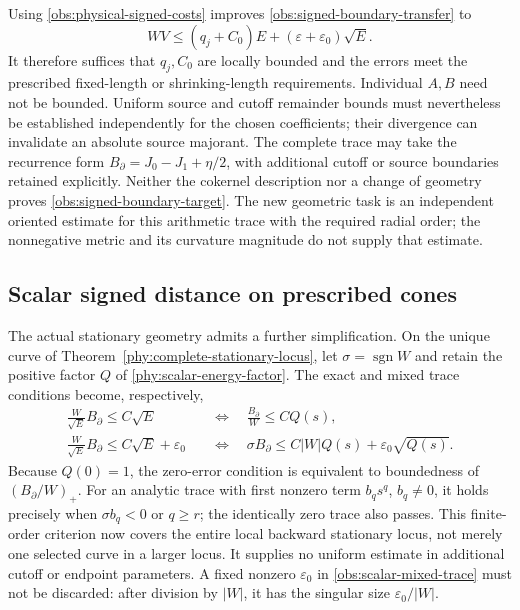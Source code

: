 \documentclass[11pt]{article}
\numberwithin{equation}{section}
\theoremstyle{definition}
\theoremstyle{remark}
\begin{document}
Using \eqref{obs:physical-signed-costs} improves
\eqref{obs:signed-boundary-transfer} to
\begin{equation}
 WV\le(q_j+C_0)E+(\varepsilon+\varepsilon_0)\sqrt E.
 \label{obs:sharpened-signed-transfer}
\end{equation}
It therefore suffices that $q_j,C_0$ are locally bounded and the
errors meet the prescribed fixed-length or shrinking-length requirements.
Individual $A,B$ need not be bounded. Uniform source and cutoff remainder
bounds must nevertheless be established independently for the chosen
coefficients; their divergence can invalidate an absolute source majorant.
The complete trace may take the recurrence form
$B_{\partial}=J_0-J_1+\eta/2$, with additional cutoff or source
boundaries retained explicitly.
Neither the cokernel description nor a change of geometry proves
\eqref{obs:signed-boundary-target}.
The new geometric task is an independent oriented estimate for this
arithmetic trace with the required radial order; the nonnegative
metric and its curvature magnitude do not supply that estimate.


\subsection{Scalar signed distance on prescribed cones}
\label{obs:scalar-cones}
The actual stationary geometry admits a further simplification.
On the unique curve of Theorem~\ref{phy:complete-stationary-locus},
let $\sigma=\operatorname{sgn}W$ and retain the positive factor $Q$
of \eqref{phy:scalar-energy-factor}. The exact and mixed trace
conditions become, respectively,
\begin{align}
 \frac W{\sqrt E}B_\partial\le C\sqrt E
 &\quad\Longleftrightarrow\quad \frac{B_\partial}{W}\le CQ(s),
 \label{obs:scalar-exact-trace}\\
 \frac W{\sqrt E}B_\partial\le C\sqrt E+\varepsilon_0
 &\quad\Longleftrightarrow\quad
 \sigma B_\partial\le C|W|Q(s)+\varepsilon_0\sqrt{Q(s)}.
 \label{obs:scalar-mixed-trace}
\end{align}
Because $Q(0)=1$, the zero-error condition is equivalent to boundedness
of $(B_\partial/W)_+$. For an analytic trace with first nonzero term $b_qs^q$, $b_q\ne0$,
it holds precisely when
$\sigma b_q<0$ or $q\ge r$; the identically zero trace also passes.
This finite-order criterion now covers the entire local backward
stationary locus, not merely one selected curve in a larger locus.
It supplies no uniform estimate in additional cutoff or endpoint
parameters. A fixed nonzero $\varepsilon_0$ in
\eqref{obs:scalar-mixed-trace} must not be discarded: after division
by $|W|$, it has the singular size $\varepsilon_0/|W|$.
\end{document}
